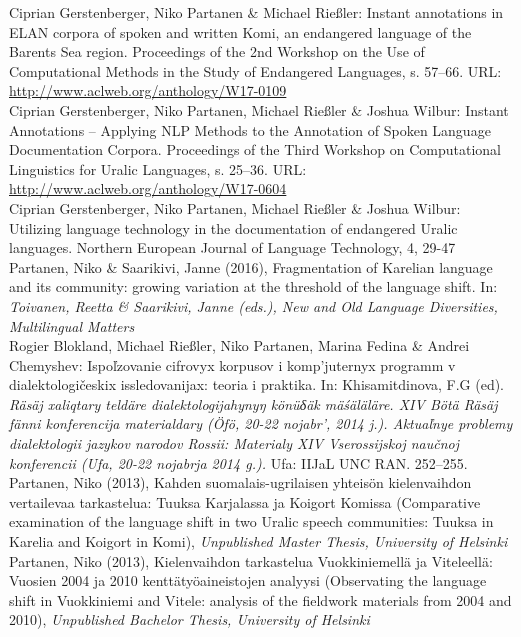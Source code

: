 \documentclass[11pt, a4paper]{article}
\newcommand{\years}[1]{\marginnote{\scriptsize #1}} %
\begin{document}
\years{2017} Ciprian Gerstenberger, Niko Partanen \& Michael Rießler: Instant annotations in ELAN corpora of spoken and written Komi, an endangered language of the Barents Sea region. Proceedings of the 2nd Workshop on the Use of Computational Methods in the Study of Endangered Languages, s. 57--66. URL: \url{http://www.aclweb.org/anthology/W17-0109}\\

\years{2017} Ciprian Gerstenberger, Niko Partanen, Michael Rießler \& Joshua Wilbur: Instant Annotations -- Applying NLP Methods to the Annotation of Spoken Language Documentation Corpora. Proceedings of the Third Workshop on Computational Linguistics for Uralic Languages, s. 25--36. URL: \url{http://www.aclweb.org/anthology/W17-0604}\\

\years{2016} Ciprian Gerstenberger, Niko Partanen, Michael Rießler \& Joshua Wilbur: Utilizing language technology in the documentation of endangered Uralic languages. Northern European Journal of Language Technology, 4, 29-47 \\

\years{2016} Partanen, Niko \& Saarikivi, Janne (2016), Fragmentation of Karelian language and its community: growing variation at the threshold of the language shift. In: \emph{Toivanen, Reetta \& Saarikivi, Janne (eds.), New and Old Language Diversities, Multilingual Matters}\\

\years{2014} Rogier Blokland, Michael Rießler, Niko Partanen, Marina Fedina \& Andrei Chemyshev: Ispoľzovanie cifrovyx korpusov i komp’juternyx programm v dialektologičeskix issledovanijax: teoria i praktika. In: Khisamitdinova, F.G (ed). \emph{Räsäj xaliqtary teldäre dialektologijahynyŋ könüδäk mäśäläläre. XIV Bötä Räsäj fänni konferencija materialdary (Öfö, 20-22 nojabr’, 2014 j.). Aktuaľnye problemy dialektologii jazykov narodov Rossii: Materialy XIV Vserossijskoj naučnoj konferencii (Ufa, 20-22 nojabrja 2014 g.).} Ufa: IIJaL UNC RAN. 252–255.\\

\years{2013}Partanen, Niko (2013), Kahden suomalais-ugrilaisen yhteisön kielenvaihdon vertailevaa tarkastelua: Tuuksa Karjalassa ja Koigort Komissa (Comparative examination of the language shift in two Uralic speech communities: Tuuksa in Karelia and Koigort in Komi), \emph{Unpublished Master Thesis, University of Helsinki}\\

\years{2013}Partanen, Niko (2013), Kielenvaihdon tarkastelua Vuokkiniemellä ja Viteleellä: Vuosien 2004 ja 2010 kenttätyöaineistojen analyysi (Observating the language shift in Vuokkiniemi and Vitele: analysis of the fieldwork materials from 2004 and 2010), \emph{Unpublished Bachelor Thesis, University of Helsinki}\\
\end{document}

